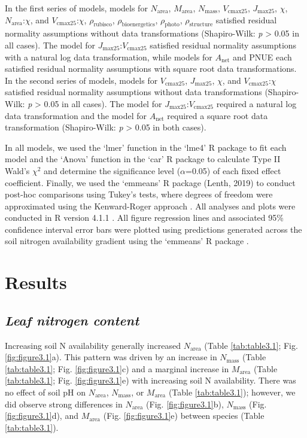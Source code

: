 In the first series of models, models for $N_\mathrm{area}$, $M_\mathrm{area}$, $N_\mathrm{mass}$, $V_\mathrm{cmax25}$, $J_\mathrm{max25}$, $\chi$, $N_{\mathrm{area}}$:$\chi$, and $V_\mathrm{cmax25}$:$\chi$, $\rho_\mathrm{rubisco}$, $\rho_\mathrm{bioenergetics}$, $\rho_\mathrm{photo}$, $\rho_\mathrm{structure}$ satisfied residual normality assumptions without data transformations (Shapiro-Wilk: \textit{p} > 0.05 in all cases). The model for $J_\mathrm{max25}$:$V_\mathrm{cmax25}$ satisfied residual normality assumptions with a natural log data transformation, while models for $A_\mathrm{net}$ and PNUE each satisfied residual normality assumptions with square root data transformations. In the second series of models, models for $V_\mathrm{cmax25}$, $J_\mathrm{max25}$, $\chi$, and $V_\mathrm{cmax25}$:$\chi$ satisfied residual normality assumptions without data transformations (Shapiro-Wilk: \textit{p} > 0.05 in all cases). The model for $J_\mathrm{max25}$:$V_\mathrm{cmax25}$ required a natural log data transformation and the model for $A_\mathrm{net}$ required a square root data transformation (Shapiro-Wilk: \textit{p} > 0.05 in both cases).
    
In all models, we used the ‘lmer’ function in the ‘lme4’ R package  to fit each model and the ‘Anova’ function in the ‘car’ R package  to calculate Type II Wald’s $\chi^2$ and determine the significance level ($\alpha$=0.05) of each fixed effect coefficient. Finally, we used the ‘emmeans’ R package (Lenth, 2019) to conduct post-hoc comparisons using Tukey’s tests, where degrees of freedom were approximated using the Kenward-Roger approach . All analyses and plots were conducted in R version 4.1.1 . All figure regression lines and associated 95\% confidence interval error bars were plotted using predictions generated across the soil nitrogen availability gradient using the ‘emmeans’ R package .
    
\section{Results}
\subsection{\textit{Leaf nitrogen content}} %
    
Increasing soil N availability generally increased $N_\mathrm{area}$ (Table \ref{tab:table3.1}; Fig. \ref{fig:figure3.1}a). This pattern was driven by an increase in $N_\mathrm{mass}$ (Table \ref{tab:table3.1}; Fig. \ref{fig:figure3.1}c) and a marginal increase in $M_\mathrm{area}$ (Table \ref{tab:table3.1}; Fig. \ref{fig:figure3.1}e) with increasing soil N availability. There was no effect of soil pH on $N_\mathrm{area}$, $N_\mathrm{mass}$, or $M_\mathrm{area}$ (Table \ref{tab:table3.1}); however, we did observe strong differences in $N_\mathrm{area}$ (Fig. \ref{fig:figure3.1}b), $N_\mathrm{mass}$ (Fig. \ref{fig:figure3.1}d), and $M_\mathrm{area}$ (Fig. \ref{fig:figure3.1}e) between species (Table \ref{tab:table3.1}).
    \clearpage

